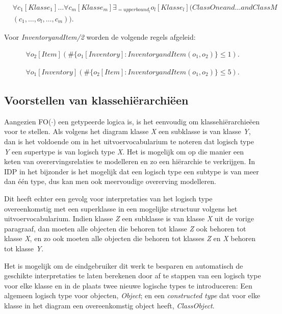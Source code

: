 	\begin{align*}
	&\forall{c_1}[Klasse_1]\ldots\forall{c_m}[Klasse_m] \exists_{=upperbound_l}o_l[Klasse_l](ClassOneand\ldots{}andClassM\\&(c_1,\ldots,o_l,\ldots,c_m)).
	\end{align*}
	
	Voor \textit{InventoryandItem/2} worden de volgende regels afgeleid:
	
\begin{align*}
		\forall{o_2}[Item](\#\{o_1[Inventory]: InventoryandItem(o_1,o_2)\} \leq 1).
\end{align*} 
		
\begin{align*}
		\forall{o_1}[Inventory](\#\{o_2[Item]: InventoryandItem(o_1,o_2)\} \leq 5).
\end{align*}

\subsection{Voorstellen van klassehi\"erarchi\"een}\label{sec:hierarchies}
Aangezien FO($\cdot$) een getypeerde logica is, is het eenvoudig om klassehi\"erarchie\"een voor te stellen. Als volgens het diagram klasse \textit{X} een subklasse is van klasse \textit{Y}, dan is het voldoende om in het uitvoervocabularium te noteren dat logisch type \textit{Y} een supertype is van logisch type \textit{X}. Het is mogelijk om op die manier een keten van overervingsrelaties te modelleren en zo een hi\"erarchie te verkrijgen. In IDP in het bijzonder is het mogelijk dat een logisch type een subtype is van meer dan \'e\'en type, dus kan men ook meervoudige overerving modelleren.

Dit heeft echter een gevolg voor interpretaties van het logisch type overeenkomstig met een superklasse in een mogelijke structuur volgens het uitvoervocabularium. Indien klasse \textit{Z} een subklasse is van klasse \textit{X} uit de vorige paragraaf, dan moeten alle objecten die behoren tot klasse \textit{Z} ook behoren tot klasse \textit{X}, en zo ook moeten alle objecten die behoren tot klasses \textit{Z} en \textit{X} behoren tot klasse \textit{Y}.

Het is mogelijk om de eindgebruiker dit werk te besparen en automatisch de geschikte interpretaties te laten berekenen door af te stappen van een logisch type voor elke klasse en in de plaats twee nieuwe logische types te introduceren: Een algemeen logisch type voor objecten, \textit{Object}; en een \textit{constructed type}\cite{DeCatBroes2014PLaa} dat voor elke klasse in het diagram een overeenkomstig object heeft, \textit{ClassObject}.

